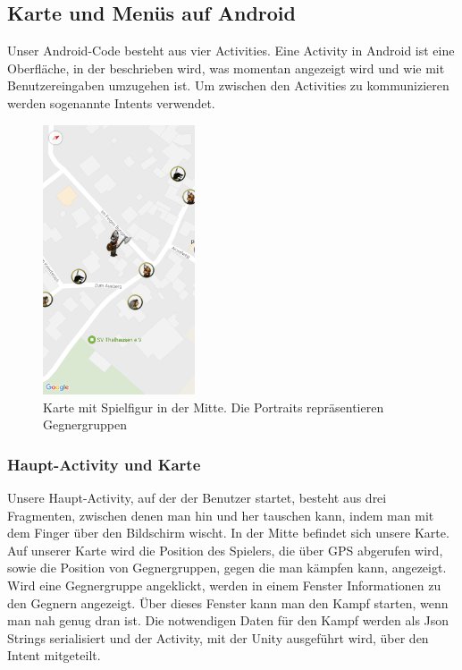 \documentclass[extern,palatino]{cgBA}
\begin{document}
\subsection{Karte und Menüs auf Android}
Unser Android-Code besteht aus vier Activities. Eine Activity in Android ist eine Oberfläche, in der beschrieben wird, was momentan angezeigt wird und wie mit Benutzereingaben umzugehen ist. Um zwischen den Activities zu kommunizieren werden sogenannte Intents verwendet. 
\begin{figure}[H] 
		\centering
		\includegraphics[width=0.4\textwidth]{map.png}
		\caption{Karte mit Spielfigur in der Mitte. Die Portraits repräsentieren
			Gegnergruppen}
		\label{fig:Bild1}
\end{figure}
\subsubsection{Haupt-Activity und Karte}Unsere Haupt-Activity, auf der der Benutzer startet, besteht aus drei Fragmenten, zwischen denen man hin und her tauschen kann, indem man mit dem Finger über den Bildschirm wischt. In der Mitte befindet sich unsere Karte. Auf unserer Karte wird die Position des Spielers, die über GPS abgerufen wird, sowie die Position von Gegnergruppen, gegen die man kämpfen kann, angezeigt. Wird eine Gegnergruppe angeklickt, werden in einem Fenster Informationen zu den Gegnern angezeigt. Über dieses Fenster kann man den Kampf starten, wenn man nah genug dran ist. Die notwendigen Daten für den Kampf werden als Json Strings serialisiert und der Activity, mit der Unity ausgeführt wird, über den Intent mitgeteilt.
	
\end{document}
